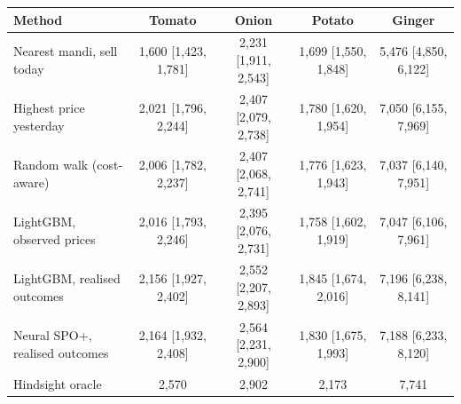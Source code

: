 \renewcommand{\arraystretch}{1.25}
\footnotesize
\begin{tabular}{|l|c|c|c|c|}
\hline
\textbf{Method} & \textbf{Tomato} & \textbf{Onion} & \textbf{Potato} & \textbf{Ginger} \\
\hline
Nearest mandi, sell today & 1,600 [1,423, 1,781] & 2,231 [1,911, 2,543] & 1,699 [1,550, 1,848] & 5,476 [4,850, 6,122] \\
\hline
Highest price yesterday & 2,021 [1,796, 2,244] & 2,407 [2,079, 2,738] & 1,780 [1,620, 1,954] & 7,050 [6,155, 7,969] \\
\hline
Random walk (cost-aware) & 2,006 [1,782, 2,237] & 2,407 [2,068, 2,741] & 1,776 [1,623, 1,943] & 7,037 [6,140, 7,951] \\
\hline
LightGBM, observed prices & 2,016 [1,793, 2,246] & 2,395 [2,076, 2,731] & 1,758 [1,602, 1,919] & 7,047 [6,106, 7,961] \\
\hline
LightGBM, realised outcomes & 2,156 [1,927, 2,402] & 2,552 [2,207, 2,893] & 1,845 [1,674, 2,016] & 7,196 [6,238, 8,141] \\
\hline
Neural SPO+, realised outcomes & 2,164 [1,932, 2,408] & 2,564 [2,231, 2,900] & 1,830 [1,675, 1,993] & 7,188 [6,233, 8,120] \\
\hline
Hindsight oracle & 2,570 & 2,902 & 2,173 & 7,741 \\
\hline
\end{tabular}
